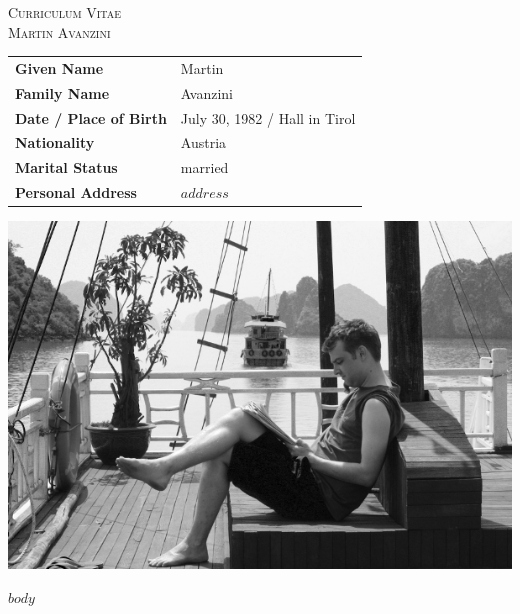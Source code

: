 \begin{center}
  {\LARGE \textsc{Curriculum Vitae}}\\[-1mm]
  {\textsc{Martin Avanzini}}
\end{center}

\vspace{1cm}

\begin{minipage}{0.65\linewidth}
\begin{tabular}{ll}
  \textbf{Given Name} & Martin\\
  \textbf{Family Name} & Avanzini \\ 
  \textbf{Date / Place of Birth} & July 30, 1982 / Hall in Tirol\\
  \textbf{Nationality} & Austria \\
  \textbf{Marital Status} & married\\
  \textbf{Personal Address} & $address$
\end{tabular}
\end{minipage}
\begin{minipage}{1\linewidth}
  \includegraphics[width=0.3\linewidth]{images/me.jpg}
\end{minipage}

\vspace{1cm}

$body$
